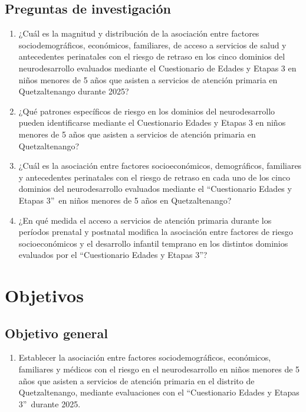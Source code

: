 \documentclass[11pt,letterpaper]{report}
\newcommand{\asq}{“Cuestionario Edades y Etapas 3”}
\begin{document}
\section{Preguntas de investigación}
	\begin{enumerate}
		\item ¿Cuál es la magnitud y distribución de la asociación entre
			factores sociodemográficos, económicos, familiares, de acceso a
			servicios de salud y antecedentes perinatales con el riesgo de
			retraso en los cinco dominios del neurodesarrollo evaluados mediante
			el Cuestionario de Edades y Etapas 3 en niños menores de 5 años que
			asisten a servicios de atención primaria en Quetzaltenango durante
			2025?
		\item ¿Qué patrones específicos de riesgo en los dominios del
			neurodesarrollo pueden identificarse mediante el Cuestionario
			Edades y Etapas 3 en niños menores de 5 años que asisten a
			servicios de atención primaria en Quetzaltenango?
		\item ¿Cuál es la asociación entre factores socioeconómicos,
			demográficos, familiares y antecedentes perinatales con el riesgo
			de retraso en cada uno de los cinco dominios del neurodesarrollo
			evaluados mediante el \asq\ en niños menores de 5 años en
			Quetzaltenango?
		\item ¿En qué medida el acceso a servicios de atención primaria durante
			los períodos prenatal y postnatal modifica la asociación entre
			factores de riesgo socioeconómicos y el desarrollo infantil
			temprano en los distintos dominios evaluados por el \asq?
	\end{enumerate}

	\chapter{Objetivos}
\section{Objetivo general}
	\begin{enumerate}
		\item Establecer la asociación entre factores sociodemográficos,
		económicos, familiares y médicos con el riesgo en el neurodesarrollo en
		niños menores de 5 años que asisten a servicios de atención primaria en
		el distrito de Quetzaltenango, mediante evaluaciones con el \asq\
		durante 2025.
	\end{enumerate}
\end{document}
